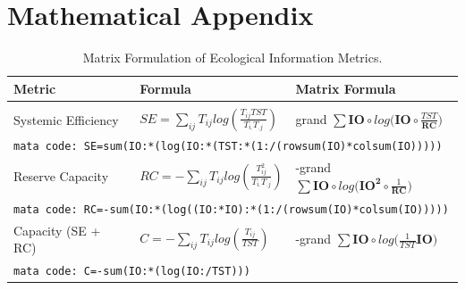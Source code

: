 \documentclass{article}
\begin{document}
\section*{Mathematical Appendix}
\begin{table}[H]
\caption{Matrix Formulation of Ecological Information Metrics.}
\label{IOmetrics_matrix}
\vskip 0.15in
\begin{sc}
\begin{center}
\begin{tabular}{ l l l }
\hline

Metric &  Formula & Matrix Formula \\
\hline
& & \\
Systemic Efficiency
  & $SE = \displaystyle\sum_{ij}{T_{ij}}
  log(\frac{T_{ij}TST}{T_{i.}T_{.j}}) $ 
  & grand $\displaystyle\sum  \mathbf{IO} \circ 
  log\bigg(\mathbf{IO} \circ  \frac{TST}{\mathbf{R}\mathbf{C}}
  \bigg)$ \\[.25in]
  
  \multicolumn{3}{l}{\hspace{.5in} \texttt{mata code:
  SE=sum(IO:*(log(IO:*(TST:*(1:/(rowsum(IO)*colsum(IO)))))}} \\[.5in]

Reserve Capacity 
  & $RC = - \displaystyle\sum_{ij}{T_{ij}} log(\frac{T_{ij}^2}{T_{i.}T_{.j}}) $ 
  & -grand $\displaystyle\sum  \mathbf{IO} \circ 
  log\bigg(\mathbf{IO^2} \circ  \frac{1}{\mathbf{R} \mathbf{C}} \bigg)$ \\[.25in]
  
\multicolumn{3}{l}{\hspace{.5in} \texttt{mata code:
  RC=-sum(IO:*(log((IO:*IO):*(1:/(rowsum(IO)*colsum(IO)))))}} \\[.5in]
  
Capacity (SE + RC)
  & $C = -\displaystyle\sum_{ij}{T_{ij}} log(\frac{T_{ij}}{TST}) $ 
  & -grand $\displaystyle\sum  \mathbf{IO} \circ 
  log\bigg(\frac{1}{TST} \mathbf{IO}\bigg)$ \\[.25in]
  
\multicolumn{3}{l}{\hspace{.5in} \texttt{mata code:
  C=-sum(IO:*(log(IO:/TST)))}} \\[.5in]
  
\end{tabular}
\end{center}
\end{sc}
\vskip -0.1in
\end{table} 



\end{document}
